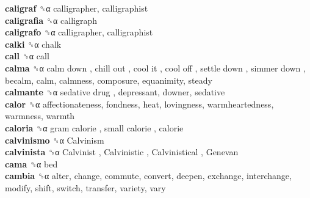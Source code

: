 \textbf{caligraf} ␝α  calligrapher, calligraphist  \\
\textbf{caligrafia} ␝α  calligraph  \\
\textbf{caligrafo} ␝α  calligrapher, calligraphist  \\
\textbf{calki} ␝α  chalk  \\
\textbf{call} ␝α  call  \\
\textbf{calma} ␝α   calm down ,  chill out ,  cool it ,  cool off ,  settle down ,  simmer down , becalm, calm, calmness, composure, equanimity, steady  \\
\textbf{calmante} ␝α   sedative drug , depressant, downer, sedative  \\
\textbf{calor} ␝α  affectionateness, fondness, heat, lovingness, warmheartedness, warmness, warmth  \\
\textbf{caloria} ␝α   gram calorie ,  small calorie , calorie  \\
\textbf{calvinismo} ␝α   Calvinism   \\
\textbf{calvinista} ␝α   Calvinist ,  Calvinistic ,  Calvinistical ,  Genevan   \\
\textbf{cama} ␝α  bed  \\
\textbf{cambia} ␝α  alter, change, commute, convert, deepen, exchange, interchange, modify, shift, switch, transfer, variety, vary  \\
